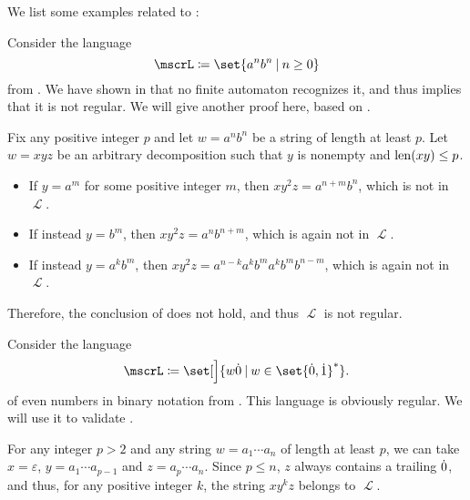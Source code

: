 \begin{example}\label{ex:thm:regular_pumping_lemma}
  We list some examples related to :
  \begin{thmenum}
     Consider the language
    \begin{equation*}
      \mscrL \coloneqq \set{ a^n b^n \given n \geq 0 }
    \end{equation*}
    from . We have shown in  that no finite automaton recognizes it, and thus  implies that it is not regular. We will give another proof here, based on .

    Fix any positive integer \( p \) and let \( w = a^n b^n \) be a string of length at least \( p \). Let \( w = xyz \) be an arbitrary decomposition such that \( y \) is nonempty and \( \operatorname{len}(xy) \leq p \).

    \begin{itemize}
      \item If \( y = a^m \) for some positive integer \( m \), then \( x y^2 z = a^{n + m} b^n \), which is not in \( \mscrL \).
      \item If instead \( y = b^m \), then \( x y^2 z = a^n b^{n + m} \), which is again not in \( \mscrL \).
      \item If instead \( y = a^k b^m \), then \( x y^2 z = a^{n-k} a^k b^m a^k b^m b^{n - m} \), which is again not in \( \mscrL \).
    \end{itemize}

    Therefore, the conclusion of  does not hold, and thus \( \mscrL \) is not regular.

     Consider the language
    \begin{equation*}
      \mscrL \coloneqq \set[\Big]{ w \syn0 \given w \in \set{ \syn0, \syn1 }^* }.
    \end{equation*}
    of even numbers in binary notation from . This language is obviously regular. We will use it to validate .

    For any integer \( p > 2 \) and any string \( w = a_1 \cdots a_n \) of length at least \( p \), we can take \( x = \varepsilon \), \( y = a_1 \cdots a_{p-1} \) and \( z = a_p \cdots a_n \). Since \( p \leq n \), \( z \) always contains a trailing \( \dot{0} \), and thus, for any positive integer \( k \), the string \( xy^kz \) belongs to \( \mscrL \).


\end{thmenum}
\end{example}
